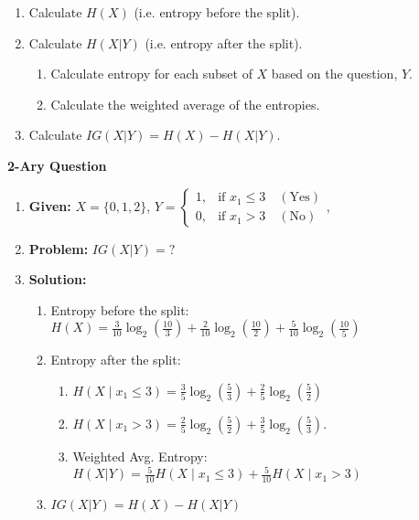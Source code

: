\begin{process}
    \begin{enumerate}
        \item Calculate \(H(X)\) (i.e. entropy before the split).
        \item Calculate \(H(X|Y)\) (i.e. entropy after the split).
        \begin{enumerate}
            \item Calculate entropy for each subset of \(X\) based on the question, \(Y\).
            \item Calculate the weighted average of the entropies.
        \end{enumerate}
        \item Calculate \(IG(X|Y) = H(X) - H(X|Y)\).
    \end{enumerate}
\end{process}

\begin{example}
\end{example}
\newpage

\begin{example} \textbf{2-Ary Question}
    \begin{enumerate}
        \item \textbf{Given:} $X= \{0,1,2\}$, $Y = 
        \begin{cases} 
        1, & \text{if } x_1 \leq 3 \quad (\text{Yes}) \\
        0, & \text{if } x_1 > 3 \quad (\text{No})
        \end{cases}$, 
        \item \textbf{Problem:} $IG(X|Y) = ?$
        \item \textbf{Solution:}
        \begin{enumerate}
            \item Entropy before the split: $H(X) = \frac{3}{10} \log_2\left(\frac{10}{3}\right) + \frac{2}{10} \log_2\left(\frac{10}{2}\right) + \frac{5}{10} \log_2\left(\frac{10}{5}\right)$
            \item Entropy after the split: 
            \begin{enumerate}
                \item $H(X \mid x_1 \leq 3) = \frac{3}{5} \log_2 \left(\frac{5}{3}\right) + \frac{2}{5} \log_2 \left(\frac{5}{2}\right)$ 
                \item $H(X \mid x_1 > 3) = \frac{2}{5} \log_2 \left(\frac{5}{2}\right) + \frac{3}{5} \log_2 \left(\frac{5}{3}\right)$.
                \item Weighted Avg. Entropy: $H(X|Y) = \frac{5}{10} H(X \mid x_1 \leq 3) + \frac{5}{10} H(X \mid x_1 > 3)$
            \end{enumerate}
            \item $IG(X|Y) = H(X) - H(X|Y)$
        \end{enumerate}
    \end{enumerate}
\end{example}

